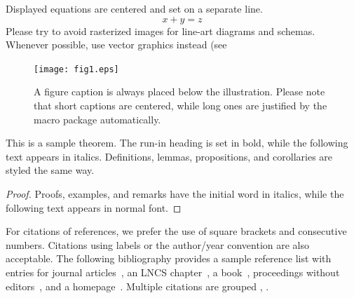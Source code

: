 \documentclass[runningheads]{llncs}
\begin{document}
\noindent Displayed equations are centered and set on a separate
line.
\begin{equation}
x + y = z
\end{equation}
Please try to avoid rasterized images for line-art diagrams and
schemas. Whenever possible, use vector graphics instead (see

\begin{figure}
\texttt{[image: fig1.eps]}
\caption{A figure caption is always placed below the illustration.
Please note that short captions are centered, while long ones are
justified by the macro package automatically.} \label{fig1}
\end{figure}

\begin{theorem}
This is a sample theorem. The run-in heading is set in bold, while
the following text appears in italics. Definitions, lemmas,
propositions, and corollaries are styled the same way.
\end{theorem}
%
%
\begin{proof}
Proofs, examples, and remarks have the initial word in italics,
while the following text appears in normal font.
\end{proof}
For citations of references, we prefer the use of square brackets
and consecutive numbers. Citations using labels or the author/year
convention are also acceptable. The following bibliography provides
a sample reference list with entries for journal
articles~\cite{ref_article1}, an LNCS chapter~\cite{ref_lncs1}, a
book~\cite{ref_book1}, proceedings without editors~\cite{ref_proc1},
and a homepage~\cite{ref_url1}. Multiple citations are grouped
\cite{ref_article1,ref_lncs1,ref_book1},
\cite{ref_article1,ref_book1,ref_proc1,ref_url1}.
\end{document}

